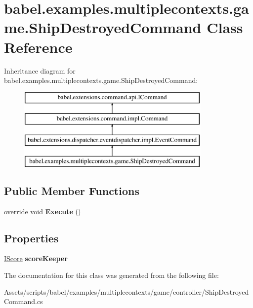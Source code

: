 \hypertarget{classbabel_1_1examples_1_1multiplecontexts_1_1game_1_1_ship_destroyed_command}{\section{babel.\-examples.\-multiplecontexts.\-game.\-Ship\-Destroyed\-Command Class Reference}
\label{classbabel_1_1examples_1_1multiplecontexts_1_1game_1_1_ship_destroyed_command}
}
Inheritance diagram for babel.\-examples.\-multiplecontexts.\-game.\-Ship\-Destroyed\-Command\-:\begin{figure}[H]
\begin{center}
\leavevmode
\includegraphics[height=4.000000cm]{classbabel_1_1examples_1_1multiplecontexts_1_1game_1_1_ship_destroyed_command}
\end{center}
\end{figure}
\subsection*{Public Member Functions}
\begin{DoxyCompactItemize}
\item 
\hypertarget{classbabel_1_1examples_1_1multiplecontexts_1_1game_1_1_ship_destroyed_command_a77ff88cebf8ce240518832c8100571e5}{override void {\bfseries Execute} ()}\label{classbabel_1_1examples_1_1multiplecontexts_1_1game_1_1_ship_destroyed_command_a77ff88cebf8ce240518832c8100571e5}

\end{DoxyCompactItemize}
\subsection*{Properties}
\begin{DoxyCompactItemize}
\item 
\hypertarget{classbabel_1_1examples_1_1multiplecontexts_1_1game_1_1_ship_destroyed_command_ace885ab743e4faf4e50b60c3caf7bf92}{\hyperlink{interfacebabel_1_1examples_1_1multiplecontexts_1_1game_1_1_i_score}{I\-Score} {\bfseries score\-Keeper}}\label{classbabel_1_1examples_1_1multiplecontexts_1_1game_1_1_ship_destroyed_command_ace885ab743e4faf4e50b60c3caf7bf92}

\end{DoxyCompactItemize}


The documentation for this class was generated from the following file\-:\begin{DoxyCompactItemize}
\item 
Assets/scripts/babel/examples/multiplecontexts/game/controller/Ship\-Destroyed\-Command.\-cs\end{DoxyCompactItemize}
